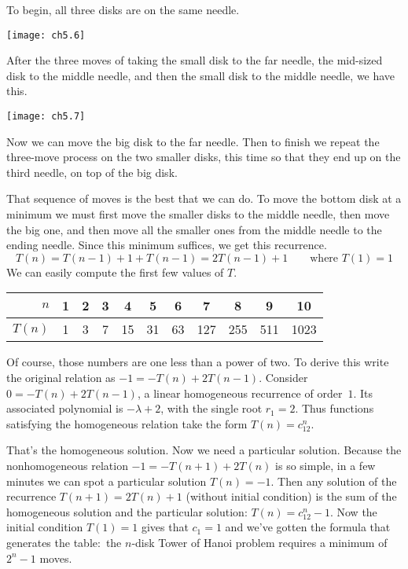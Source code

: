 To begin, all three disks are on the same needle.
\begin{center}
  \texttt{[image: ch5.6]}
\end{center}
After the three moves of taking the small disk to the far needle, 
the mid-sized disk to the
middle needle, and then the small disk to the middle needle,
we have this. 
\begin{center}
  \texttt{[image: ch5.7]}
\end{center}
Now we can  move the big disk to the far needle.
Then to finish we repeat the three-move process on the two smaller 
disks, this time so that they end up on the third needle, 
on top of the big disk.

That sequence of moves is the best that we can do.
To move the bottom disk
at a minimum we must first move the smaller disks to the middle needle, 
then move the big one,
and then move all the smaller ones from the middle needle 
to the ending needle. 
Since this minimum suffices, we get this recurrence.
\begin{equation*}
  T(n)=T(n-1)+1+T(n-1)=2T(n-1)+1 \qquad \text{where $T(1)=1$}
\end{equation*} 
We can easily compute the first few values of $T$.
\begin{center}
  \begin{tabular}{r|cccccccccc}
    $n$    &1  &2  &3  &4  &5  &6     &7    &8    &9   &10  \\
    \hline
    $T(n)$ &1  &3  &7  &15  &31  &63  &127  &255  &511 &1023 
  \end{tabular}
\end{center}
Of course, those numbers are one less than a power of two.
To derive this 
write the original relation as $-1=-T(n)+2T(n-1)$.
Consider $0=-T(n)+2T(n-1)$, a linear homogeneous recurrence of order~$1$. 
Its associated polynomial is $-\lambda+2$, 
with the single root $r_1=2$.
Thus
functions satisfying the homogeneous relation take the form $T(n)=c_12^n$.

That's the homogeneous solution.
Now we need a particular solution. 
Because the nonhomogeneous relation $-1=-T(n+1)+2T(n)$ is so simple, 
in a few minutes
we can spot a particular solution $T(n)=-1$.
Then any solution of the recurrence 
$T(n+1)=2T(n)+1$ (without initial condition)
is the sum of the homogeneous solution and the
particular solution: $T(n)=c_12^n-1$.
Now the initial condition $T(1)=1$ gives that $c_1=1$ and we've gotten
the formula that generates the table:~the $n$-disk Tower of Hanoi problem 
requires a minimum of $2^n-1$ moves.

